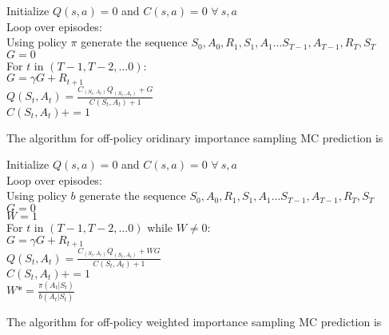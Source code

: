 \documentclass[11pt,a4paper]{article}
\begin{document}
\begin{tcolorbox}[enhanced,title=On-policy prediction]
Initialize $Q(s,a)=0$ and $C(s,a)=0$ $\forall~s,a$ \\
Loop over episodes: \\
 \phantom{abcd} Using policy $\pi$ generate the sequence $S_0,A_0, R_1,S_1,A_1 \dots S_{T-1}, A_{T-1},R_T,S_T$ \\
 \phantom{abcd} $G=0$ \\
  \phantom{abcd} For $t$ in $(T-1,T-2,\dots 0)$: \\
  \phantom{abcd}   \phantom{abcd}  $G = \gamma G + R_{t+1}$ \\
  \phantom{abcd}   \phantom{abcd}  $Q(S_t,A_t) = \frac{C_(S_t,A_t) Q_(S_t,A_t) +G}{C(S_t,A_t)+1}$ \\
    \phantom{abcd}   \phantom{abcd}  $C(S_t,A_t) += 1$
\end{tcolorbox}

The algorithm for off-policy oridinary importance sampling MC prediction is

\begin{tcolorbox}[enhanced,title=Off-policy ordinary importance sampling prediction]
Initialize $Q(s,a)=0$ and $C(s,a)=0$ $\forall~s,a$ \\
Loop over episodes: \\
 \phantom{abcd} Using policy $b$ generate the sequence  $S_0,A_0, R_1,S_1,A_1 \dots S_{T-1}, A_{T-1},R_T,S_T$ \\
 \phantom{abcd} $G=0$ \\
  \phantom{abcd} $W=1$ \\
  \phantom{abcd} For $t$ in $(T-1,T-2,\dots 0)$ while $W \ne 0$: \\
  \phantom{abcd}   \phantom{abcd}  $G = \gamma G + R_{t+1}$ \\
  \phantom{abcd}   \phantom{abcd}  $Q(S_t,A_t) = \frac{C_(S_t,A_t) Q_(S_t,A_t) +W G}{C(S_t,A_t)+1}$ \\
    \phantom{abcd}   \phantom{abcd}  $C(S_t,A_t) += 1$ \\
    \phantom{abcd}   \phantom{abcd}  $W*= \frac{\pi(A_t|S_t)}{b(A_t|S_t)}$   
\end{tcolorbox}

The algorithm for off-policy weighted importance sampling MC prediction is
\end{document}
